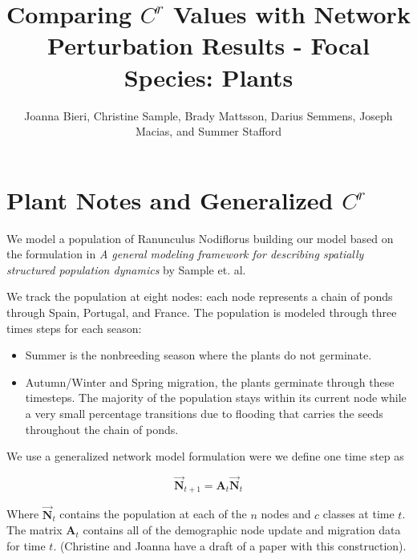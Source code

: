 \documentclass[10pt]{article}
\title{Comparing $C^r$ Values with Network Perturbation Results - Focal Species: Plants}
\date{}
\author{Joanna Bieri, Christine Sample, Brady Mattsson, Darius Semmens, Joseph Macias, and Summer Stafford}
\begin{document}


\newcommand{\multilineR}[1]{\begin{tabular}[b]{@{}r@{}}#1\end{tabular}}
\newcommand{\multilineL}[1]{\begin{tabular}[b]{@{}l@{}}#1\end{tabular}}
\newcommand{\multilineC}[1]{\begin{tabular}[b]{@{}c@{}}#1\end{tabular}}

\thispagestyle{empty}

\maketitle

\tableofcontents


\section{Plant Notes and Generalized \texorpdfstring{$C^r$}{CR} }
We model a population of Ranunculus Nodiflorus building our model based on the formulation in  {\it{A general modeling framework for describing spatially structured population dynamics}} by Sample et. al.

We track the population at eight nodes: each node represents a chain of ponds through Spain, Portugal, and France. The population is modeled through three times steps for each season:
\begin{itemize}
\item Summer is the nonbreeding season where the plants do not germinate.
\item Autumn/Winter and Spring migration, the plants germinate through these timesteps. The majority of the population stays within its current node while a very small percentage transitions due to flooding that carries the seeds throughout the chain of ponds.
\end{itemize}

We use a generalized network model formulation were we define one time step as

\begin{equation}
\vec{\mathbf{N}}_{t+1}={\mathbf{A}_t}\vec{\mathbf{N}}_t
\end{equation}

Where $\vec{\mathbf{N}}_{t}$ contains the population at each of the $n$ nodes and $c$ classes at time $t$. The matrix $\mathbf{A}_t$ contains all of the demographic node update and migration data for time $t$. (Christine and Joanna have a draft of a paper with this construction).\\
\end{document}
